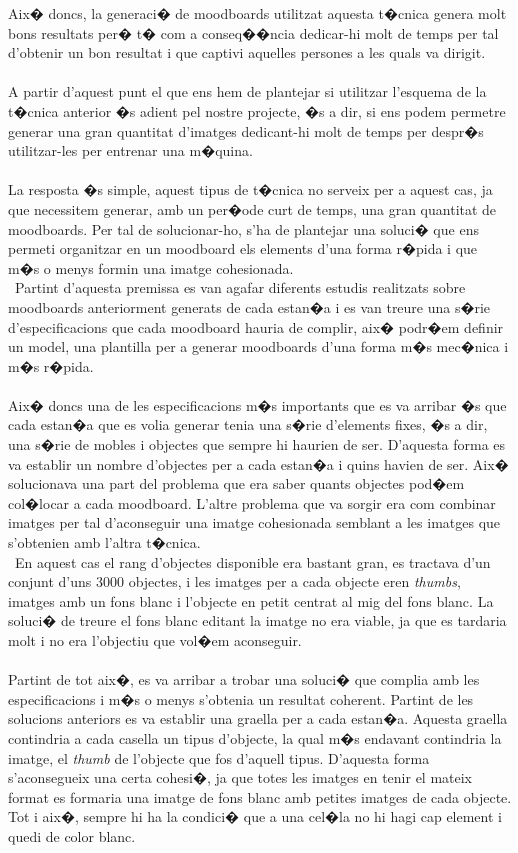 \documentclass[12pt,a4paper,openright,oneside]{article}
\numberwithin{equation}{section}
\theoremstyle{definition}
\begin{document}
Aix� doncs, la generaci� de moodboards utilitzat aquesta t�cnica genera molt bons resultats per� t� com a conseq��ncia dedicar-hi molt de temps per tal d'obtenir un bon resultat i que captivi aquelles persones a les quals va dirigit. \\\\
A partir d'aquest punt el que ens hem de plantejar si utilitzar l'esquema de la t�cnica anterior �s adient pel nostre projecte, �s a dir, si ens podem permetre generar una gran quantitat d'imatges dedicant-hi molt de temps per despr�s utilitzar-les per entrenar una m�quina.\\\\
La resposta �s simple, aquest tipus de t�cnica no serveix per a aquest cas, ja que necessitem generar, amb un per�ode curt de temps, una gran quantitat de moodboards. Per tal de solucionar-ho, s'ha de plantejar una soluci� que ens permeti organitzar en un moodboard els elements d'una forma r�pida i que m�s o menys formin una imatge cohesionada. \\\
Partint d'aquesta premissa es van agafar diferents estudis realitzats sobre moodboards anteriorment generats de cada estan�a i es van treure una s�rie d'especificacions que cada moodboard hauria de complir, aix� podr�em definir un model, una plantilla per a generar moodboards d'una forma m�s mec�nica i m�s r�pida.\\\\
Aix� doncs una de les especificacions m�s importants que es va arribar �s que cada estan�a que es volia generar tenia una s�rie d'elements fixes, �s a dir, una s�rie de mobles i objectes que sempre hi haurien de ser. D'aquesta forma es va establir un nombre d'objectes per a cada estan�a i quins havien de ser. Aix� solucionava una part del problema que era saber quants objectes pod�em col�locar a cada moodboard. L'altre problema que va sorgir era com combinar imatges per tal d'aconseguir una imatge cohesionada semblant a les imatges que s'obtenien amb l'altra t�cnica. \\\
En aquest cas el rang d'objectes disponible era bastant gran, es tractava d'un conjunt d'uns 3000 objectes, i les imatges per a cada objecte eren \textit{thumbs}, imatges amb un fons blanc i l'objecte en petit centrat al mig del fons blanc. La soluci� de treure el fons blanc editant la imatge no era viable, ja que es tardaria molt i no era l'objectiu que vol�em aconseguir. \\\\
Partint de tot aix�, es va arribar a trobar una soluci� que complia amb les especificacions i m�s o menys s'obtenia un resultat coherent. Partint de les solucions anteriors es va establir una graella per a cada estan�a. Aquesta graella contindria a cada casella un tipus d'objecte, la qual m�s endavant contindria la imatge, el \textit{thumb} de l'objecte que fos d'aquell tipus. D'aquesta forma s'aconsegueix una certa cohesi�, ja que totes les imatges en tenir el mateix format es formaria una imatge de fons blanc amb petites imatges de cada objecte. Tot i aix�, sempre hi ha la condici� que a una cel�la no hi hagi cap element i quedi de color blanc. \\\\
\end{document}
